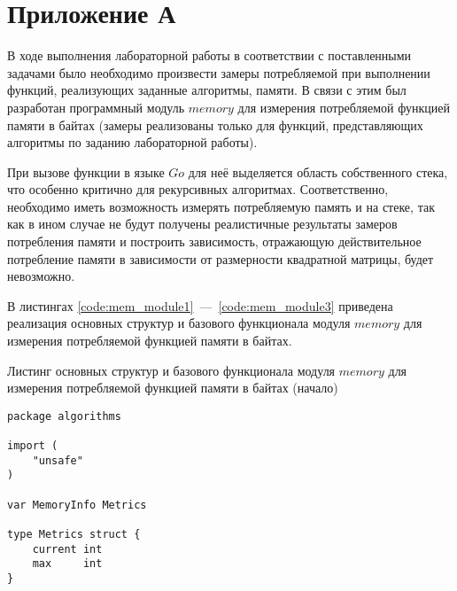 \setcounter{chapter}{5}
\setcounter{listing}{0}
\chapter*{Приложение А}
\label{appendix}

В ходе выполнения лабораторной работы в соответствии с поставленными задачами было необходимо произвести замеры потребляемой при выполнении функций, реализующих заданные алгоритмы, памяти. В связи с этим был разработан программный модуль $memory$ для измерения потребляемой функцией памяти в байтах (замеры реализованы только для функций, представляющих алгоритмы по заданию лабораторной работы). 

При вызове функции в языке $Go$ для неё выделяется область собственного стека, что особенно критично для рекурсивных алгоритмах. Соответственно, необходимо иметь возможность измерять потребляемую память и на стеке, так как в ином случае не будут получены реалистичные результаты замеров потребления памяти и построить зависимость, отражающую действительное потребление памяти в зависимости от размерности квадратной матрицы, будет невозможно.

В листингах \ref{code:mem_module1}~---~\ref{code:mem_module3} приведена реализация основных структур и базового функционала модуля $memory$ для измерения потребляемой функцией памяти в байтах.

\begin{code}
\caption{Листинг основных структур и базового функционала модуля $memory$ для измерения потребляемой функцией памяти в байтах (начало)}
\label{code:mem_module1}

\begin{verbatim}
package algorithms

import (
	"unsafe"
)

var MemoryInfo Metrics

type Metrics struct {
	current int
	max     int
}
\end{verbatim}
\end{code}

\newpage


